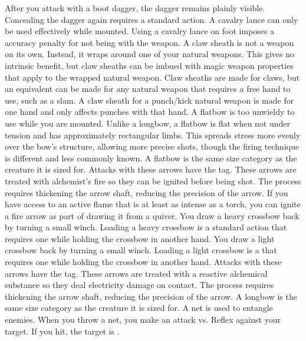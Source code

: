     After you attack with a boot dagger, the dagger remains plainly visible.
    Concealing the dagger again requires a standard action.
     A cavalry lance can only be used effectively while mounted.
    Using a cavalry lance on foot imposes a  accuracy penalty for not being  with the weapon.
     A claw sheath is not a weapon on its own.
    Instead, it wraps around one of your natural weapons.
    This gives no intrinsic benefit, but claw sheaths can be imbued with magic weapon properties that apply to the wrapped natural weapon.
    Claw sheaths are made for claws, but an equivalent can be made for any natural weapon that requires a free hand to use, such as a slam.
    A claw sheath for a punch/kick natural weapon is made for one hand and only affects punches with that hand.
     A flatbow is too unwieldy to use while you are mounted.
    Unlike a longbow, a flatbow is flat when not under tension and has approximately rectangular limbs.
    This spreads stress more evenly over the bow's structure, allowing more precise shots, though the firing technique is different and less commonly known.
    A flatbow is the same size category as the creature it is sized for.
     Attacks with these arrows have the \atFire tag.
    These arrows are treated with alchemist's fire so they can be ignited before being shot.
    The process requires thickening the arrow shaft, reducing the precision of the arrow.
    If you have access to an active flame that is at least as intense as a torch, you can ignite a fire arrow as part of drawing it from a quiver.
     You draw a heavy crossbow back by turning a small winch.
    Loading a heavy crossbow is a standard action that requires one  while holding the crossbow in another hand.
     You draw a light crossbow back by turning a small winch.
    Loading a light crossbow is a  that requires one  while holding the crossbow in another hand.
     Attacks with these arrows have the \atElectricity tag.
    These arrows are treated with a reactive alchemical substance so they deal electricity damage on contact.
    The process requires thickening the arrow shaft, reducing the precision of the arrow.
     A longbow is the same size category as the creature it is sized for.
     A net is used to entangle enemies. When you throw a net, you make an attack vs. Reflex against your target. If you hit, the target is \slowed.
